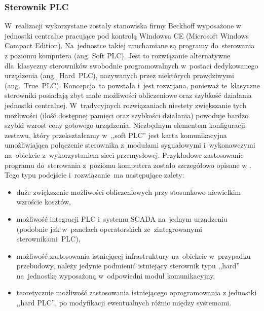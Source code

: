 \subsubsection{Sterownik PLC}
W~realizacji wykorzystane zostały stanowiska firmy Beckhoff wyposażone w jednostki centralne pracujące pod kontrolą Windowsa CE (Microsoft Windows Compact Edition). Na~jednostce takiej uruchamiane są programy do~sterowania z poziomu komputera (ang. Soft PLC). Jest to rozwiązanie alternatywne dla~klasyczny sterowników swobodnie programowalnych w~postaci dedykowanego urządzenia (ang.~Hard~PLC), nazywanych przez niektórych prawdziwymi (ang.~True~PLC).
Koncepcja~ta powstała i~jest rozwijana, ponieważ te~klasyczne sterowniki posiadają zbyt małe możliwości obliczeniowe oraz szybkość działania jednostki centralnej. W~tradycyjnych rozwiązaniach niestety zwiększanie tych możliwości (ilość dostępnej pamięci oraz szybkości działania) powoduje bardzo szybki wzrost ceny gotowego urządzenia.
Niezbędnym elementem konfiguracji zestawu, który przekształcamy w~,,soft PLC'' jest karta komunikacyjna umożliwiająca połączenie sterownika z~modułami sygnałowymi i~wykonawczymi na~obiekcie z~wykorzystaniem sieci przemysłowej.
Przykładowe zastosowanie programu do~sterowania z~poziomu komputera zostało szczegółowo opisane w \cite{art_softPLC}.
Tego typu podejście i~rozwiązanie~ma następujące zalety:
\begin{itemize}
\item duże zwiększenie możliwości obliczeniowych przy stosunkowo niewielkim wzroście kosztów,
\item możliwość integracji PLC i~systemu SCADA na~jednym urządzeniu (podobnie jak w~panelach operatorskich ze~zintegrowanymi sterownikami~PLC),
\item możliwość zastosowania istniejącej infrastruktury na~obiekcie w~przypadku przebudowy, należy jedynie podmienić istniejący sterownik typu ,,hard'' na~jednostkę wyposażoną w~odpowiedni moduł komunikacyjny,
\item teoretycznie możliwość zastosowania istniejącego oprogramowania z jednostki ,,hard PLC'', po modyfikacji ewentualnych różnic między systemami.
\end{itemize}

